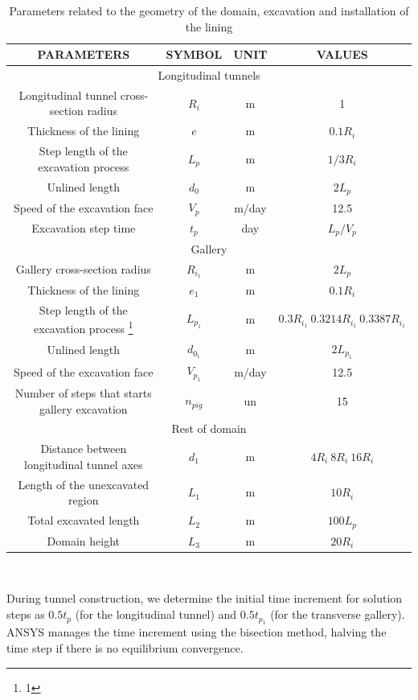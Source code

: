 \documentclass[a4paper,fleqn]{cas-sc}
\begin{document}
\begin{table}
	\caption{Parameters related to the geometry of the domain, excavation and installation of the lining}
	\label{table1}
	\centering
	\renewcommand{\arraystretch}{1.25}
	\begin{tabular}{c c c c}
		\hline
		\multicolumn{1}{c}{PARAMETERS} &
		\multicolumn{1}{c}{SYMBOL} &
		\multicolumn{1}{c}{UNIT} &
		\multicolumn{1}{c}{VALUES} \\
		\hline
		\multicolumn{4}{c}{Longitudinal tunnels} \\
		\hline
		Longitudinal tunnel cross-section radius & $R_i$ & m & 1 \\
		Thickness of the lining & $e$ & m & $0.1R_i$ \\
		Step length of the excavation process & $L_p$ & m & $1/3R_i$ \\
		Unlined length & $d_0$ & m & $2L_p$ \\
		Speed of the excavation face & $V_p$ & m/day & 12.5 \\
		Excavation step time & $t_p$ & day & $L_p/V_p$ \\
		\hline
		\multicolumn{4}{c}{Gallery} \\
		\hline
		Gallery cross-section radius & $R_{i_1}$ & m & $2L_p$ \\
		Thickness of the lining & $e_1$ & m & $0.1R_i$ \\
		Step length of the excavation process \footnote{1} & $L_{p_1}$ & m & $0.3R_{i_1} ~0.3214R_{i_1} ~0.3387R_{i_1}$ \\
		Unlined length & $d_{0_1}$ & m & $2L_{p_1}$ \\
		Speed of the excavation face & $V_{p_1}$ & m/day & 12.5 \\
		Number of steps that starts gallery excavation & $n_{pig}$ & un & 15 \\
		\hline
		\multicolumn{4}{c}{Rest of domain} \\
		\hline
		Distance between longitudinal tunnel axes & $d_1$ & m & $4R_i ~8R_i ~16R_i$ \\
		Length of the unexcavated region & $L_1$ & m & $10R_i$ \\
		Total excavated length & $L_2$ & m & $100L_p$ \\
		Domain height & $L_3$ & m & $20R_i$ \\
		\hline
	\end{tabular}
	\normalsize
	\\ 
\end{table}
\FloatBarrier
During tunnel construction, we determine the initial time increment for solution steps as $0.5t_p$ (for the longitudinal tunnel) and $0.5t_{p_1}$ (for the transverse gallery). ANSYS manages the time increment using the bisection method, halving the time step if there is no equilibrium convergence.
\end{document}
